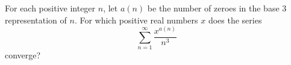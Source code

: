 For each positive integer $n$, let $a(n)$ be the number of zeroes in
the base 3 representation of $n$. For which positive real numbers $x$
does the series
\[
\sum_{n=1}^\infty \frac{x^{a(n)}}{n^3}
\]
converge?
